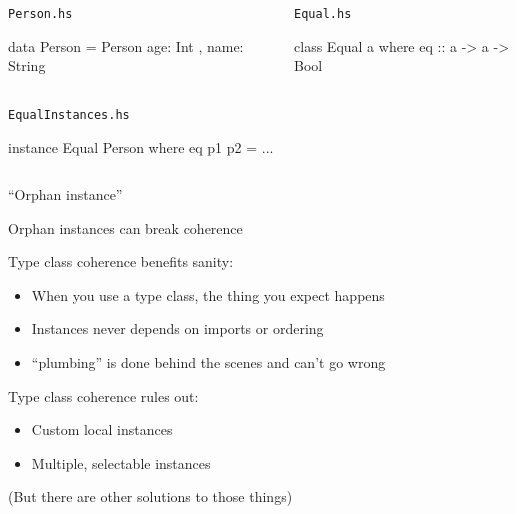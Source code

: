 \documentclass[usenames,dvipsnames,svgnames,table,aspectratio=169,mathserif]{beamer}
\newcommand{\nl}{\vspace{\baselineskip}}
\newcommand{\pnl}{\pause \nl}
\begin{document}
\begin{frame}[fragile]

\begin{columns}
\begin{column}[T]{0.49\textwidth}
\begin{block}{\tt Person.hs}
\begin{haskellcode}
data Person = Person
  { age: Int
  , name: String }
\end{haskellcode}
\end{block}
\end{column}
\begin{column}{0.02\textwidth}
\end{column}
\begin{column}[T]{0.49\textwidth}
\begin{block}{\tt Equal.hs}
\begin{haskellcode}
class Equal a where
  eq :: a -> a -> Bool
\end{haskellcode}
\end{block}
\end{column}
\end{columns}

\begin{columns}
\begin{column}{0.5\textwidth}
\begin{block}{\tt EqualInstances.hs}
\begin{haskellcode}
instance Equal Person where
  eq p1 p2 = ...
\end{haskellcode}
\end{block}
\end{column}
\end{columns}
\pause
\begin{center}
``Orphan instance''

Orphan instances can break coherence
\end{center}

\end{frame}


\begin{frame}
Type class coherence benefits sanity:

\begin{itemize}
\item When you use a type class, the thing you expect happens
\item Instances never depends on imports or ordering
\item ``plumbing'' is done behind the scenes and can't go wrong
\end{itemize}

\pnl

Type class coherence rules out:

\begin{itemize}
\item Custom local instances
\item Multiple, selectable instances
\end{itemize}

(But there are other solutions to those things)
\end{frame}
\end{document}
